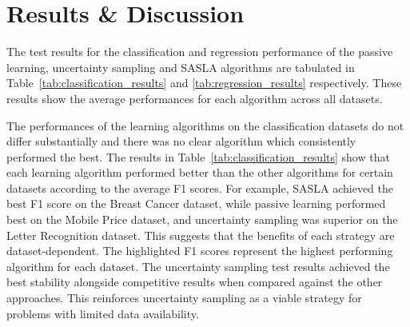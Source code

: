 \documentclass[conference]{IEEEtran}
\begin{document}
	\section{Results \& Discussion}\label{RD}
	The test results for the classification and regression performance of the passive learning, uncertainty sampling and SASLA algorithms are tabulated in Table~\ref{tab:classification_results} and \ref{tab:regression_results} respectively. These results show the average performances for each algorithm across all datasets. 
	
	The performances of the learning algorithms on the classification datasets do not differ substantially and there was no clear algorithm which consistently performed the best. The results in Table~\ref{tab:classification_results} show that each learning algorithm performed better than the other algorithms for certain datasets according to the average F1 scores. For example, SASLA achieved the best F1 score on the Breast Cancer dataset, while passive learning performed best on the Mobile Price dataset, and uncertainty sampling was superior on the Letter Recognition dataset. This suggests that the benefits of each strategy are dataset-dependent. The highlighted F1 scores represent the highest performing algorithm for each dataset. The uncertainty sampling test results achieved the best stability alongside competitive results when compared against the other approaches. This reinforces uncertainty sampling as a viable strategy for problems with limited data availability. 
	
\end{document}
